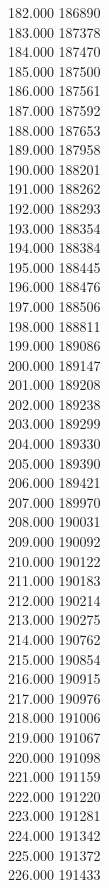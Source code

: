{ 182.000	186890 \\
 183.000	187378 \\
 184.000	187470 \\
 185.000	187500 \\
 186.000	187561 \\
 187.000	187592 \\
 188.000	187653 \\
 189.000	187958 \\
 190.000	188201 \\
 191.000	188262 \\
 192.000	188293 \\
 193.000	188354 \\
 194.000	188384 \\
 195.000	188445 \\
 196.000	188476 \\
 197.000	188506 \\
 198.000	188811 \\
 199.000	189086 \\
 200.000	189147 \\
 201.000	189208 \\
 202.000	189238 \\
 203.000	189299 \\
 204.000	189330 \\
 205.000	189390 \\
 206.000	189421 \\
 207.000	189970 \\
 208.000	190031 \\
 209.000	190092 \\
 210.000	190122 \\
 211.000	190183 \\
 212.000	190214 \\
 213.000	190275 \\
 214.000	190762 \\
 215.000	190854 \\
 216.000	190915 \\
 217.000	190976 \\
 218.000	191006 \\
 219.000	191067 \\
 220.000	191098 \\
 221.000	191159 \\
 222.000	191220 \\
 223.000	191281 \\
 224.000	191342 \\
 225.000	191372 \\
 226.000	191433 \\
}
